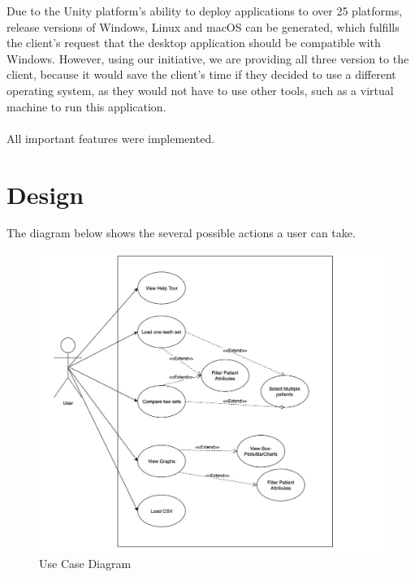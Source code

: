 \documentclass[11pt,english, titlepage]{article}
\begin{document}
    Due to the Unity platform's ability to deploy applications to over 25 platforms, release versions of Windows, Linux and macOS can be generated, which fulfills the client's request that the desktop application should be compatible with Windows. However, using our initiative, we are providing all three version to the client, because it would save the client's time if they decided to use a different operating system, as they would not have to use other tools, such as a virtual machine to run this application.\\
    \\
    All important features were implemented.
  \pagebreak
  \section*{Design}

  The diagram below shows the several possible actions a user can take.

      \begin{figure}[H]
        \begin{center}
        \includegraphics[width=120mm,scale=0.5]{usecase}
        \caption{Use Case Diagram}
        \label{fig:usecase}
        \end{center}
      \end{figure}
\end{document}
